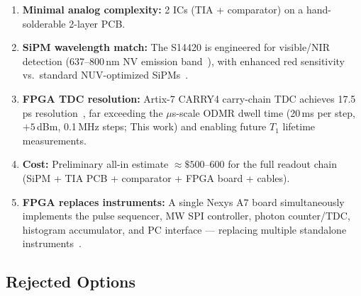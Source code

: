 \begin{enumerate}
  \item \textbf{Minimal analog complexity:} 2 ICs (TIA + comparator) on a hand-solderable
    2-layer PCB.
  \item \textbf{SiPM wavelength match:} The S14420 is engineered for visible/NIR detection
    (637--800\,nm NV emission band~\cite{Doherty2013}), %
    with enhanced red sensitivity vs.\ standard NUV-optimized SiPMs~\cite{S14420datasheet}.
  \item \textbf{FPGA TDC resolution:} Artix-7 CARRY4 carry-chain TDC achieves
    17.5\,ps resolution~\cite{Lim2025}, %
    far exceeding the $\mu$s-scale ODMR dwell time (20\,ms per step, $+5$\,dBm,
    0.1\,MHz steps; This work) and enabling future $T_1$ lifetime measurements.
  \item \textbf{Cost:} Preliminary all-in estimate $\approx\!\$500$--600 for the full
    readout chain (SiPM + TIA PCB + comparator + FPGA board + cables).
  \item \textbf{FPGA replaces instruments:} A single Nexys A7 board simultaneously
    implements the pulse sequencer, MW SPI controller, photon counter/TDC, histogram
    accumulator, and PC interface — replacing multiple standalone instruments~\cite{NexysA7refmanual}.
\end{enumerate}

\subsection{Rejected Options}

